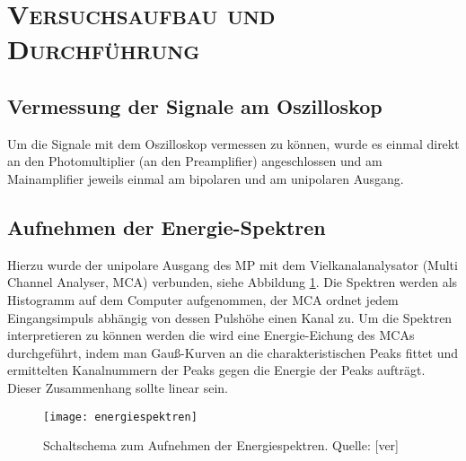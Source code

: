 \clearpage
\section{\textsc{Versuchsaufbau und Durchführung}}
\subsection{Vermessung der Signale am Oszilloskop}
Um die Signale mit dem Oszilloskop vermessen zu können, wurde es einmal direkt an den Photomultiplier (an den Preamplifier) angeschlossen und am Mainamplifier jeweils einmal am bipolaren und am unipolaren Ausgang.
\subsection{Aufnehmen der Energie-Spektren}
Hierzu wurde der unipolare Ausgang des MP mit dem Vielkanalanalysator (Multi Channel Analyser, MCA) verbunden, siehe Abbildung \ref{fig:spek_auf}. Die Spektren werden als Histogramm auf dem Computer aufgenommen, der MCA ordnet jedem Eingangsimpuls abhängig von dessen Pulshöhe einen Kanal zu. Um die Spektren interpretieren zu können werden die wird eine Energie-Eichung des MCAs durchgeführt, indem man Gauß-Kurven an die charakteristischen Peaks fittet und ermittelten Kanalnummern der Peaks gegen die Energie der Peaks aufträgt. Dieser Zusammenhang sollte linear sein.

\begin{figure}[h]
\begin{center}
\texttt{[image: energiespektren]}
\caption{Schaltschema zum Aufnehmen der Energiespektren. Quelle: [ver]}
\label{fig:spek_auf}
\end{center}
\end{figure}
